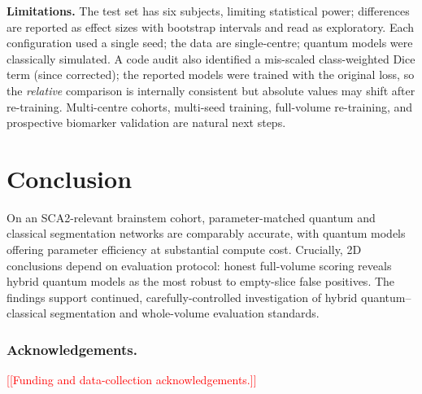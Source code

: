 \documentclass[runningheads]{llncs}
\newcommand{\todo}[1]{\textcolor{red}{[[#1]]}}
\begin{document}
\noindent\textbf{Limitations.} The test set has six subjects, limiting
statistical power; differences are reported as effect sizes with bootstrap
intervals and read as exploratory. Each configuration used a single seed; the
data are single-centre; quantum models were classically simulated. A code audit
also identified a mis-scaled class-weighted Dice term (since corrected); the
reported models were trained with the original loss, so the \emph{relative}
comparison is internally consistent but absolute values may shift after
re-training. Multi-centre cohorts, multi-seed training, full-volume re-training,
and prospective biomarker validation are natural next steps.

\section{Conclusion}
On an SCA2-relevant brainstem cohort, parameter-matched quantum and classical
segmentation networks are comparably accurate, with quantum models offering
parameter efficiency at substantial compute cost. Crucially, 2D conclusions
depend on evaluation protocol: honest full-volume scoring reveals hybrid quantum
models as the most robust to empty-slice false positives. The findings support
continued, carefully-controlled investigation of hybrid quantum--classical
segmentation and whole-volume evaluation standards.

\subsubsection*{Acknowledgements.} \todo{Funding and data-collection
acknowledgements.}
\end{document}
